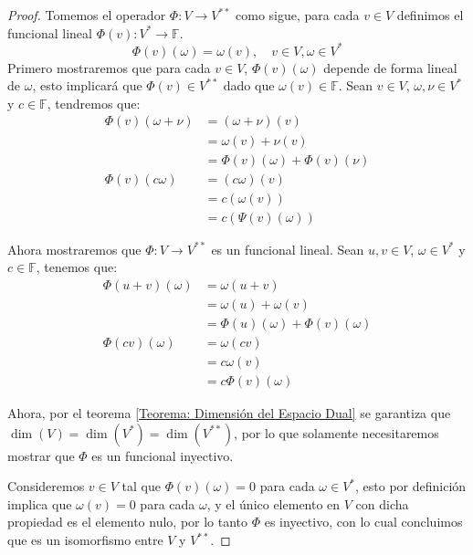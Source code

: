 \begin{proof}
	Tomemos el operador $\Phi: V \to V^{**}$ como sigue, para cada $v \in V$ definimos el funcional lineal $\Phi(v): V^{*} \to \mathbb{F}$.
	\[
		\Phi(v)(\omega) = \omega(v), \quad v \in V, \omega \in V^{*}
	\]
	Primero mostraremos que para cada $v \in V$, $\Phi(v)(\omega)$ depende de forma lineal de $\omega$, esto implicará que $\Phi(v) \in V^{**}$ dado que $\omega(v) \in \mathbb{F}$. Sean $v \in V$, $\omega,\nu \in V^{*}$ y $c \in \mathbb{F}$, tendremos que:
	\begin{align*}
		\Phi(v)(\omega + \nu) & = (\omega + \nu)(v)              \\
		                      & = \omega(v) + \nu(v)             \\
		                      & = \Phi(v)(\omega) + \Phi(v)(\nu) \\
		\Phi(v)(c \omega)     & = (c\omega)(v)                   \\
    &= c(\omega(v))\\
    &= c(\Psi(v)(\omega))
	\end{align*}

  Ahora mostraremos que $\Phi: V \to V^{**}$ es un funcional lineal. Sean $u,v \in V$, $\omega \in V^{*}$ y $c \in \mathbb{F}$, tenemos que:
	\begin{align*}
		\Phi(u + v)(\omega) & = \omega(u + v)                     \\
		                    & = \omega(u) + \omega(v)             \\
		                    & = \Phi(u)(\omega) + \Phi(v)(\omega) \\
		\Phi(c v)(\omega)   & = \omega(cv)                        \\
		                    & = c\omega(v)                        \\
		                    & = c \Phi(v)(\omega)
	\end{align*}

	Ahora, por el teorema \ref{Teorema: Dimensión del Espacio Dual} se garantiza que $\dim(V) = \dim(V^{*}) = \dim(V^{**})$, por lo que solamente necesitaremos mostrar que $\Phi$ es un funcional inyectivo.

	Consideremos $v \in V$ tal que $\Phi(v)(\omega) = 0$ para cada $\omega \in V^{*}$, esto por definición implica que $\omega(v) = 0$ para cada $\omega$, y el único elemento en $V$ con dicha propiedad es el elemento nulo, por lo tanto $\Phi$ es inyectivo, con lo cual concluimos que es un isomorfismo entre $V$ y $V^{**}$.
\end{proof}

